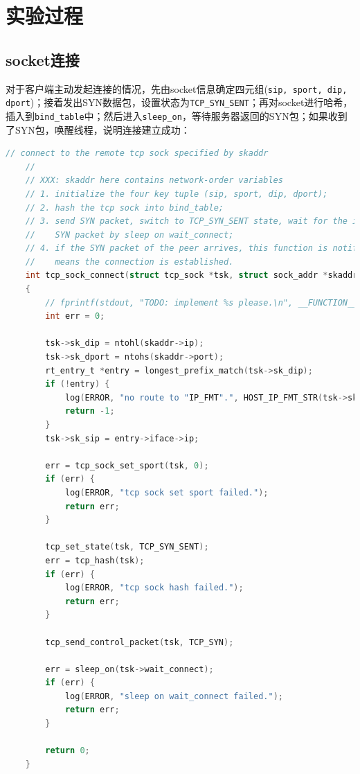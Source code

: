 \documentclass[UTF8]{report}
\begin{document}
\section{实验过程}

\subsection{socket连接}

对于客户端主动发起连接的情况，先由socket信息确定四元组(\texttt{sip, sport, dip, dport})；接着发出SYN数据包，设置状态为\texttt{TCP_SYN_SENT}；再对socket进行哈希，插入到\texttt{bind_table}中；然后进入\texttt{sleep_on}，等待服务器返回的SYN包；如果收到了SYN包，唤醒线程，说明连接建立成功：

\begin{lstlisting}[language=C]
    // connect to the remote tcp sock specified by skaddr
    //
    // XXX: skaddr here contains network-order variables
    // 1. initialize the four key tuple (sip, sport, dip, dport);
    // 2. hash the tcp sock into bind_table;
    // 3. send SYN packet, switch to TCP_SYN_SENT state, wait for the incoming
    //    SYN packet by sleep on wait_connect;
    // 4. if the SYN packet of the peer arrives, this function is notified, which
    //    means the connection is established.
    int tcp_sock_connect(struct tcp_sock *tsk, struct sock_addr *skaddr)
    {
        // fprintf(stdout, "TODO: implement %s please.\n", __FUNCTION__);
        int err = 0;
    
        tsk->sk_dip = ntohl(skaddr->ip);
        tsk->sk_dport = ntohs(skaddr->port);
        rt_entry_t *entry = longest_prefix_match(tsk->sk_dip);
        if (!entry) {
            log(ERROR, "no route to "IP_FMT".", HOST_IP_FMT_STR(tsk->sk_dip));
            return -1;
        }
        tsk->sk_sip = entry->iface->ip;
    
        err = tcp_sock_set_sport(tsk, 0);
        if (err) {
            log(ERROR, "tcp sock set sport failed.");
            return err;
        }
    
        tcp_set_state(tsk, TCP_SYN_SENT);
        err = tcp_hash(tsk);
        if (err) {
            log(ERROR, "tcp sock hash failed.");
            return err;
        }
    
        tcp_send_control_packet(tsk, TCP_SYN);
    
        err = sleep_on(tsk->wait_connect);
        if (err) {
            log(ERROR, "sleep on wait_connect failed.");
            return err;
        }
    
        return 0;
    }
\end{lstlisting}
\end{document}
